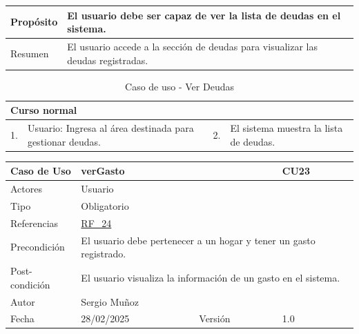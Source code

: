 \begin{table}[H]
    \centering
    \begin{tabular}{| m{} | m{} | m{} | m{} |}
        \hline
        Propósito & \multicolumn{3}{m{0.67\textwidth}|}{El usuario debe ser capaz de ver la lista de deudas en el sistema.} \\ 
        \hline
        Resumen & \multicolumn{3}{m{0.67\textwidth}|}{El usuario accede a la sección de deudas para visualizar las deudas registradas.} \\ 
        \hline
    \end{tabular}
\end{table}

\begin{table}[H]
    \centering
    \begin{tabular}{| m{} | m{} | m{} | m{} |}
        \hline
        \multicolumn{4}{|m{0.9\textwidth}|}{Curso normal} \\ 
        \hline
        1. & Usuario: Ingresa al área destinada para gestionar deudas.
        & 2. & El sistema muestra la lista de deudas. \\ 
        \hline
    \end{tabular}
    \caption{Caso de uso - Ver Deudas}
\end{table}

\newpage

\begin{table}[H]
    \centering
    \begin{tabular}{| m{} | m{} | m{} | m{} |}
        \hline
        \rowcolor[HTML]{C0C0C0} Caso de Uso & \multicolumn{2}{|m{0.43\textwidth}|}{verGasto} &  CU23\\ 
        \hline
        Actores & \multicolumn{3}{l|}{Usuario} \\ 
        \hline
        Tipo & \multicolumn{3}{l|}{Obligatorio} \\ 
        \hline
        Referencias & \multicolumn{3}{l|}{\hyperref[req:RF24]{RF\_24}} \\ 
        \hline
        Precondición & \multicolumn{3}{m{0.67\textwidth}|}{El usuario debe pertenecer a un hogar y tener un gasto registrado.} \\ 
        \hline
        Post-condición & \multicolumn{3}{m{0.67\textwidth}|}{El usuario visualiza la información de un gasto en el sistema.} \\ 
        \hline
        Autor & \multicolumn{3}{l|}{Sergio Muñoz} \\ 
        \hline
        Fecha & 28/02/2025 & Versión & 1.0 \\ 
        \hline
    \end{tabular}
\end{table}

